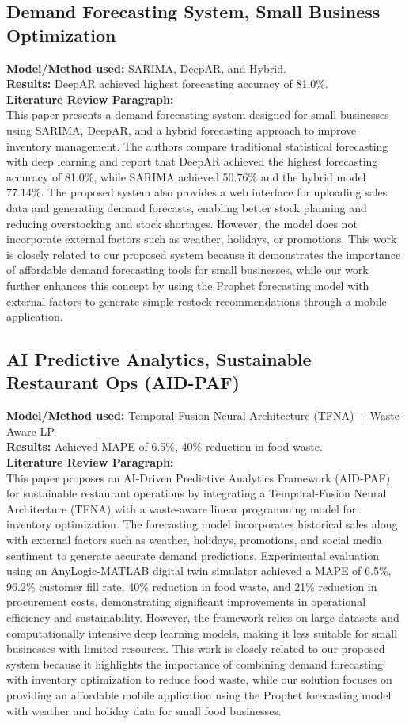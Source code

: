 \documentclass[conference]{IEEEtran}
\begin{document}
\subsection{Demand Forecasting System, Small Business Optimization}
\textbf{Model/Method used:} SARIMA, DeepAR, and Hybrid.\\
\textbf{Results:} DeepAR achieved highest forecasting accuracy of 81.0\%.\\
\textbf{Literature Review Paragraph:}\\
This paper presents a demand forecasting system designed for small businesses using SARIMA, DeepAR, and a hybrid forecasting approach to improve inventory management. The authors compare traditional statistical forecasting with deep learning and report that DeepAR achieved the highest forecasting accuracy of 81.0\%, while SARIMA achieved 50.76\% and the hybrid model 77.14\%. The proposed system also provides a web interface for uploading sales data and generating demand forecasts, enabling better stock planning and reducing overstocking and stock shortages. However, the model does not incorporate external factors such as weather, holidays, or promotions. This work is closely related to our proposed system because it demonstrates the importance of affordable demand forecasting tools for small businesses, while our work further enhances this concept by using the Prophet forecasting model with external factors to generate simple restock recommendations through a mobile application.

\subsection{AI Predictive Analytics, Sustainable Restaurant Ops (AID-PAF)}
\textbf{Model/Method used:} Temporal-Fusion Neural Architecture (TFNA) + Waste-Aware LP.\\
\textbf{Results:} Achieved MAPE of 6.5\%, 40\% reduction in food waste.\\
\textbf{Literature Review Paragraph:}\\
This paper proposes an AI-Driven Predictive Analytics Framework (AID-PAF) for sustainable restaurant operations by integrating a Temporal-Fusion Neural Architecture (TFNA) with a waste-aware linear programming model for inventory optimization. The forecasting model incorporates historical sales along with external factors such as weather, holidays, promotions, and social media sentiment to generate accurate demand predictions. Experimental evaluation using an AnyLogic-MATLAB digital twin simulator achieved a MAPE of 6.5\%, 96.2\% customer fill rate, 40\% reduction in food waste, and 21\% reduction in procurement costs, demonstrating significant improvements in operational efficiency and sustainability. However, the framework relies on large datasets and computationally intensive deep learning models, making it less suitable for small businesses with limited resources. This work is closely related to our proposed system because it highlights the importance of combining demand forecasting with inventory optimization to reduce food waste, while our solution focuses on providing an affordable mobile application using the Prophet forecasting model with weather and holiday data for small food businesses.
\end{document}

